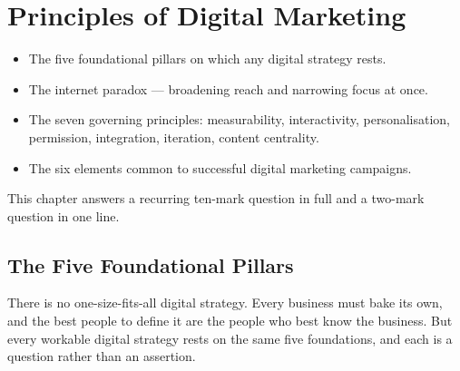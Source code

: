 \documentclass{MMTextbook}
\begin{document}
\chapter{Principles of Digital Marketing}


\begin{learningoutcomes}
\begin{itemize}
\item The five foundational pillars on which any digital strategy rests.
\item The internet paradox --- broadening reach and narrowing focus at once.
\item The seven governing principles: measurability, interactivity,
      personalisation, permission, integration, iteration, content centrality.
\item The six elements common to successful digital marketing campaigns.
\end{itemize}
\end{learningoutcomes}

\begin{keybox}
This chapter answers a recurring ten-mark question in full and a two-mark
question in one line.
\end{keybox}

\section{The Five Foundational Pillars}

There is no one-size-fits-all digital strategy. Every business must bake its
own, and the best people to define it are the people who best know the
business. But every workable digital strategy rests on the same five
foundations, and each is a question rather than an assertion.
\end{document}
